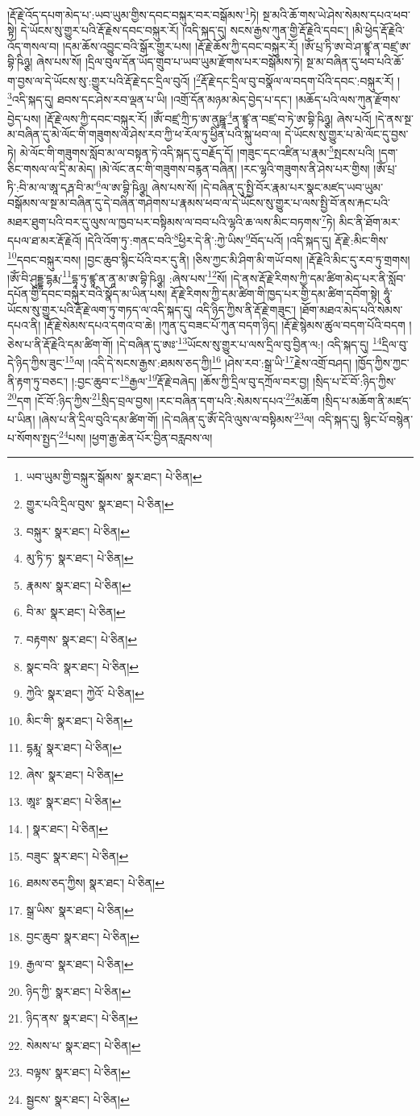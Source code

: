 །རྡོ་རྗེ་འོད་དཔག་མེད་པ་:ཡབ་ཡུམ་གྱིས་དབང་བསྐུར་བར་བསྒོམས་\footnote{ཡབ་ཡུམ་གྱི་བསྐུར་སྒོམས་  སྣར་ཐང་།  པེ་ཅིན། }ཏེ། སྔ་མའི་ཆོ་གས་ཡེ་ཤེས་སེམས་དཔའ་ཕབ་སྟེ། དེ་ཡོངས་སུ་གྱུར་པའི་རྡོ་རྗེས་དབང་བསྐུར་རོ། །འདི་སྐད་དུ། སངས་རྒྱས་ཀུན་གྱི་རྡོ་རྗེའི་དབང་། །མི་ཕྱེད་རྡོ་རྗེའི་འོད་གསལ་བ། །དམ་ཆོས་འབྱུང་བའི་སྒོར་གྱུར་པས། །རྡོ་རྗེ་ཆོས་ཀྱི་དབང་བསྐུར་རོ། །ཨོཾ་པྲ་ཏི་ཨ་བེ་ཤ་ཛྙཱ་ན་བཛྲ་ཨ་བྷི་ཥིཉྩ། ཞེས་པས་སོ། །དྲིལ་བུལ་དོན་ཡོད་གྲུབ་པ་ཡབ་ཡུམ་རྫོགས་པར་བསྒོམས་ཏེ། སྔ་མ་བཞིན་དུ་ཕབ་པའི་ཆོ་ག་བྱས་ལ་དེ་ཡོངས་སུ་:གྱུར་པའི་རྡོ་རྗེ་དང་དྲིལ་བུའོ། །\footnote{གྱུར་པའི་དྲིལ་བུས་  སྣར་ཐང་།  པེ་ཅིན། }རྡོ་རྗེ་དང་དྲིལ་བུ་བསྣོལ་ལ་བདག་པོའི་དབང་:བསྐུར་རོ། །
\footnote{བསྐུར་  སྣར་ཐང་།  པེ་ཅིན། }འདི་སྐད་དུ། ཐབས་དང་ཤེས་རབ་ལྡན་པ་ཡི། །འགྲོ་དོན་མཉམ་མེད་བྱེད་པ་དང་། །མཆོད་པའི་ལས་ཀུན་རྫོགས་བྱེད་པས། །རྡོ་རྗེ་ལས་ཀྱི་དབང་བསྐུར་རོ། །ཨོཾ་བཛྲ་ཀྲི་ཏ་ཨ་ནུཥྛཱ་\footnote{མུ་ཏི་ཏ་  སྣར་ཐང་།  པེ་ཅིན། }ན་ཛྙཱ་ན་བཛྲ་བ་ཏེ་ཨ་བྷི་ཥིཉྩ། ཞེས་པའོ། །དེ་ནས་སྔ་མ་བཞིན་དུ་མེ་ལོང་གི་གཟུགས་ལ་ཤེས་རབ་ཀྱི་ཕ་རོལ་ཏུ་ཕྱིན་པའི་སྐུ་ཕབ་ལ། དེ་ཡོངས་སུ་གྱུར་པ་མེ་ལོང་དུ་བྱས་ཏེ། མེ་ལོང་གི་གཟུགས་སློབ་མ་ལ་བསྟན་ཏེ་འདི་སྐད་དུ་བརྗོད་དོ། །གཟུང་དང་འཛིན་པ་རྣམ་\footnote{རྣམས་  སྣར་ཐང་།  པེ་ཅིན། }སྤངས་པའི། །དག་ཅིང་གསལ་ལ་དྲི་མ་མེད། །མེ་ལོང་ནང་གི་གཟུགས་བརྙན་བཞིན། །རང་ལྷའི་གཟུགས་ནི་ཤེས་པར་གྱིས། །ཨོཾ་པྲ་ཏི་:བི་མ་ལ་ཨཱ་དརྴ་བི་མ་\footnote{བི་མ་  སྣར་ཐང་།  པེ་ཅིན། }ལ་ཨ་བྷི་ཥིཉྩ། ཞེས་པས་སོ། །དེ་བཞིན་དུ་སྤྱི་བོར་རྣམ་པར་སྣང་མཛད་ཡབ་ཡུམ་བསྒོམས་ལ་སྔ་མ་བཞིན་དུ་དེ་བཞིན་གཤེགས་པ་རྣམས་ཕབ་ལ་དེ་ཡོངས་སུ་གྱུར་པ་ལས་སྤྱི་བོ་ནས་རྐང་པའི་མཐར་ཐུག་པའི་བར་དུ་ལུས་ལ་ཁྱབ་པར་བསྟིམས་ལ་བབ་པའི་ལྷའི་ཆ་ལས་མིང་བཏགས་\footnote{བརྟགས་  སྣར་ཐང་།  པེ་ཅིན། }ཏེ། མིང་ནི་ཐོག་མར་དཔལ་ཐ་མར་རྡོ་རྗེའོ། །དེའི་འོག་ཏུ་:གནང་བའི་\footnote{སྣང་བའི་  སྣར་ཐང་།  པེ་ཅིན། }ཕྱིར་དེ་ནི་:ཀྱེ་ཡིས་\footnote{ཀྱེའི་  སྣར་ཐང་། ཀྱེའོ་  པེ་ཅིན། }བོད་པའོ། །འདི་སྐད་དུ། རྡོ་རྗེ་:མིང་གིས་\footnote{མིང་གི་  སྣར་ཐང་།  པེ་ཅིན། }དབང་བསྐུར་བས། །བྱང་ཆུབ་སྙིང་པོའི་བར་དུ་ནི། །ཅིས་ཀྱང་མི་ཤིག་མི་གཡོ་བས། །རྡོ་རྗེའི་མིང་དུ་རབ་ཏུ་གྲགས། །ཨོཾ་བི་ཤུདྡྷ་དྷརྨ་\footnote{དྷརྨཱ་  སྣར་ཐང་།  པེ་ཅིན། }དྷཱ་ཏུ་ཛྙཱ་ན་ནཱ་མ་ཨ་བྷི་ཥིཉྩ། :ཞེས་པས་\footnote{ཞེས་  སྣར་ཐང་།  པེ་ཅིན། }སོ། །དེ་ནས་རྡོ་རྗེ་རིགས་ཀྱི་དམ་ཚིག་མེད་པར་ནི་སློབ་དཔོན་གྱི་དབང་བསྐུར་བའི་སྣོད་མ་ཡིན་པས། རྡོ་རྗེ་རིགས་ཀྱི་དམ་ཚིག་གི་ཁྱད་པར་གྱི་དམ་ཚིག་དབོག་སྟེ། ཧཱུཾ་ཡོངས་སུ་གྱུར་པའི་རྡོ་རྗེ་ལག་ཏུ་གཏད་ལ་འདི་སྐད་དུ། འདི་ཉིད་ཀྱིས་ནི་རྡོ་རྗེ་གཟུང་། །ཐོག་མཐའ་མེད་པའི་སེམས་དཔའ་ནི། །རྡོ་རྗེ་སེམས་དཔའ་དགའ་བ་ཆེ། །ཀུན་དུ་བཟང་པོ་ཀུན་བདག་ཉིད། །རྡོ་རྗེ་སྙེམས་ཚུལ་བདག་པོའི་བདག །ཅེས་པ་ནི་རྡོ་རྗེའི་དམ་ཚིག་གོ། །དེ་བཞིན་དུ་ཨཿ་\footnote{ཨཱཿ་  སྣར་ཐང་།  པེ་ཅིན། }ཡོངས་སུ་གྱུར་པ་ལས་དྲིལ་བུ་བྱིན་ལ:། འདི་སྐད་དུ། \footnote{།    སྣར་ཐང་།  པེ་ཅིན། }དྲིལ་བུ་དེ་ཉིད་ཀྱིས་ཟུང་\footnote{བཟུང་  སྣར་ཐང་།  པེ་ཅིན། }ལ། །འདི་དེ་སངས་རྒྱས་:ཐམས་ཅད་ཀྱི།\footnote{ཐམས་ཅད་ཀྱིས།  སྣར་ཐང་།  པེ་ཅིན། } །ཤེས་རབ་:སྒྲ་ཡི་\footnote{སྒྲ་ཡིས་  སྣར་ཐང་།  པེ་ཅིན། }རྗེས་འགྲོ་བཤད། །ཁྱོད་ཀྱིས་ཀྱང་ནི་རྟག་ཏུ་བཅང་། །:བྱང་ཆུབ་ང་\footnote{བྱང་ཆུབ་  སྣར་ཐང་།  པེ་ཅིན། }རྒྱལ་\footnote{རྒྱལ་བ་  སྣར་ཐང་།  པེ་ཅིན། }རྡོ་རྗེ་བཞེད། །ཆོས་ཀྱི་དྲིལ་བུ་དཀྲོལ་བར་བྱ། །སྲིད་པ་ངོ་བོ་:ཉིད་ཀྱིས་\footnote{ཉིད་ཀྱི་  སྣར་ཐང་།  པེ་ཅིན། }དག །ངོ་བོ་:ཉིད་ཀྱིས་\footnote{ཉིད་ནས་  སྣར་ཐང་།  པེ་ཅིན། }སྲིད་བྲལ་བྱས། །རང་བཞིན་དག་པའི་:སེམས་དཔའ་\footnote{སེམས་པ་  སྣར་ཐང་།  པེ་ཅིན། }མཆོག །སྲིད་པ་མཆོག་ནི་མཛད་པ་ཡིན། །ཞེས་པ་ནི་དྲིལ་བུའི་དམ་ཚིག་གོ། །དེ་བཞིན་དུ་ཨོཾ་དེའི་ལུས་ལ་བསྟིམས་\footnote{བལྟས་  སྣར་ཐང་།  པེ་ཅིན། }ལ། འདི་སྐད་དུ། སྙིང་པོ་བསྙེན་པ་སོགས་སྤྱད་\footnote{སྦྱངས་  སྣར་ཐང་།  པེ་ཅིན། }པས། །ཕྱག་རྒྱ་ཆེན་པོར་བྱིན་བརླབས་ལ། 